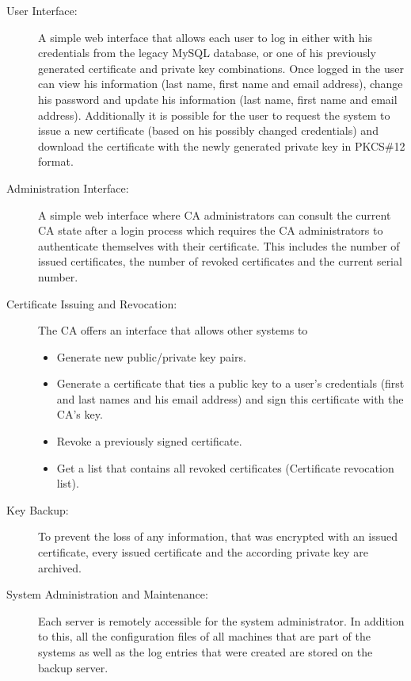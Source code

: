 \documentclass[a4paper, toc=index, 12pt, DIV14, twoside, BCOR2cm, headsepline, numbers=noenddot, bibliography=totoc]{scrbook}
\begin{document}
\begin{description}
\item[User Interface: ]
A simple web interface that allows each user to log in either with his credentials from the legacy MySQL database, or one of his previously generated certificate and private key combinations.
Once logged in the user can view his information (last name, first name and email address), change his password and update his information (last name, first name and email address).
Additionally it is possible for the user to request the system to issue a new certificate (based on his possibly changed credentials) and download the certificate with the newly generated private key in PKCS\#12 format.

\item[Administration Interface: ]
A simple web interface where CA administrators can consult the current CA state after a login process which requires the CA administrators to authenticate themselves with their certificate. This includes the number of issued certificates, the number of revoked certificates and the current serial number.

\item[Certificate Issuing and Revocation: ]
The CA offers an interface that allows other systems to
\begin{itemize}
\item Generate new public/private key pairs.
\item Generate a certificate that ties a public key to a user's credentials (first and last names and his email address) and sign this certificate with the CA's key.
\item Revoke a previously signed certificate.
\item Get a list that contains all revoked certificates (Certificate revocation list).
\end{itemize}

\item[Key Backup: ]
To prevent the loss of any information, that was encrypted with an issued certificate, every issued certificate and the according private key are archived.

\item[System Administration and Maintenance: ]
Each server is remotely accessible for the system administrator. In addition to this, all the configuration files of all machines that are part of the systems as well as the log entries that were created are stored on the backup server.
\end{description}
\end{document}
